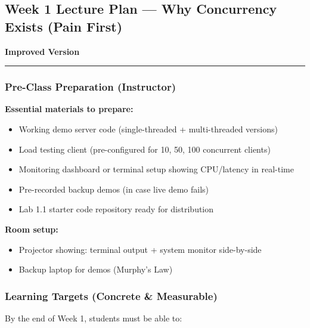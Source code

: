 \documentclass[11pt,a4paper]{article}
\begin{document}

\subsection*{Week 1 Lecture Plan --- Why Concurrency Exists (Pain First)}
\textbf{Improved Version}

\vspace{2mm}
\hrule
\vspace{3mm}

\subsubsection*{Pre-Class Preparation (Instructor)}

\textbf{Essential materials to prepare:}
\begin{itemize}[leftmargin=*]
	\item[$\square$] Working demo server code (single-threaded + multi-threaded versions)
	\item[$\square$] Load testing client (pre-configured for 10, 50, 100 concurrent clients)
	\item[$\square$] Monitoring dashboard or terminal setup showing CPU/latency in real-time
	\item[$\square$] Pre-recorded backup demos (in case live demo fails)
	\item[$\square$] Lab 1.1 starter code repository ready for distribution
\end{itemize}

\textbf{Room setup:}
\begin{itemize}[leftmargin=*]
	\item Projector showing: terminal output + system monitor side-by-side
	\item Backup laptop for demos (Murphy's Law)
\end{itemize}

\subsubsection*{Learning Targets (Concrete \& Measurable)}

By the end of Week 1, students must be able to:
\end{document}
